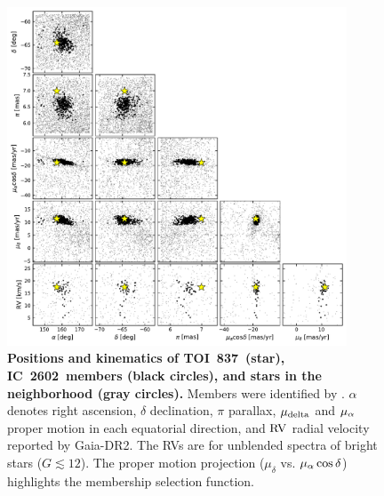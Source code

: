 \documentclass[12pt,twocolumn,tighten]{aastex63}
\newcommand{\tn}{TOI~837} %
\newcommand{\cn}{IC~2602} %
\begin{document}
\begin{figure}[!t]
	\begin{center}
		\leavevmode
		\includegraphics[width=0.9\textwidth]{f8.pdf}
	\end{center}
	\vspace{-0.7cm}
	\caption{ 
  {\bf Positions and kinematics of \tn\ (star), \cn\ members (black
  circles), and stars in the neighborhood (gray circles).} Members
  were identified by \citet{cantatgaudin_gaia_2018}.  $\alpha$ denotes
  right ascension, $\delta$ declination, $\pi$ parallax, $\mu_{\rm
  delta}$ and $\mu_{\rm \alpha}$ proper motion in each equatorial
  direction, and ${\rm RV}$ radial velocity reported by Gaia-DR2.  The
  RVs are for unblended spectra of bright stars ($G\lesssim 12$).  The
  proper motion projection ($\mu_{\delta}$ vs{.} $\mu_{\rm
  \alpha}\cos\delta$) highlights the membership selection function.
  \label{fig:full_kinematics}
	}
\end{figure}
\end{document}
